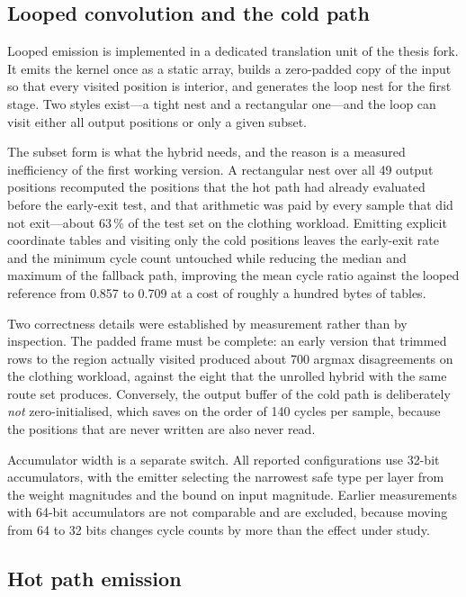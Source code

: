 \subsection{Looped convolution and the cold path}

Looped emission is implemented in a dedicated translation unit of the thesis fork.
It emits the kernel once as a static array, builds a zero-padded copy of the input so that every visited position is interior, and generates the loop nest for the first stage.
Two styles exist---a tight nest and a rectangular one---and the loop can visit either all output positions or only a given subset.

The subset form is what the hybrid needs, and the reason is a measured inefficiency of the first working version.
A rectangular nest over all 49 output positions recomputed the positions that the hot path had already evaluated before the early-exit test, and that arithmetic was paid by every sample that did not exit---about 63\,\% of the test set on the clothing workload.
Emitting explicit coordinate tables and visiting only the cold positions leaves the early-exit rate and the minimum cycle count untouched while reducing the median and maximum of the fallback path, improving the mean cycle ratio against the looped reference from 0.857 to 0.709 at a cost of roughly a hundred bytes of tables.

Two correctness details were established by measurement rather than by inspection.
The padded frame must be complete: an early version that trimmed rows to the region actually visited produced about 700 argmax disagreements on the clothing workload, against the eight that the unrolled hybrid with the same route set produces.
Conversely, the output buffer of the cold path is deliberately \emph{not} zero-initialised, which saves on the order of 140 cycles per sample, because the positions that are never written are also never read.

Accumulator width is a separate switch.
All reported configurations use 32-bit accumulators, with the emitter selecting the narrowest safe type per layer from the weight magnitudes and the bound on input magnitude.
Earlier measurements with 64-bit accumulators are not comparable and are excluded, because moving from 64 to 32 bits changes cycle counts by more than the effect under study.

\subsection{Hot path emission}

